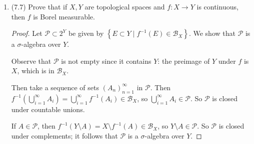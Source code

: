\documentclass[11pt]{article}
\newcommand{\cbr}[1]{\left\{#1\right\}}
\begin{document}
\begin{enumerate}
\begin{enumerate}
\begin{proof}
          But we know that the real numbers are uncountable, and we seek to find a contradiction. To that end, suppose by contradiction that $\mathscr{B}_\mathbb{R}$ is atomic so that there exists a sequence $(A_n)_{n=1}^\infty$ of disjoint, nonempty subsets whose union is $\mathbb{R}$.

          We should be able to form for any real number $r$ the singleton set $\cbr{r}$ by taking a countable union of the $A_i$. Since the $A_i$ are disjoint and nonempty, it would follow that there is an $A_k$ appearing in this union that is actually just equal to $\cbr{r}$, and that the countable union is really just the union of the one set $A_k$. 
          
          Since this is true for any real number $r$, it would seem that either all of the $A_i$ are singleton sets of real numbers, or that there exists an $A_j$ with more than one element. We rule out the latter scenario: If $A_j$ contains more than one element, e.g., it contains real numbers $x,y$, then it is impossible to form the Borel set $\cbr{x}$ as a countable union of the $A_i$ since each of the $A_i$ are disjoint.
          
          It must follow then that each of the $A_i$s are singleton sets of real numbers. However, the real numbers are uncountable so that it is impossible for $\bigcap_{n=1}^\infty A_n$ to be equal to $\mathbb{R}$. This is a contradiction, so $\mathscr{B}_\mathbb{R}$ is not atomic.
        \end{proof}
    \end{enumerate}
    \item (7.7) Prove that if $X,Y$ are topological spaces and $f\colon X\to Y$ is continuous, then $f$ is Borel measurable. \begin{proof}
      Let $\mathscr{P}\subset 2^Y$ be given by $\cbr{E\subset Y\mid f^{-1}(E)\in \mathscr{B}_X}$. We show that $\mathscr{P}$ is a $\sigma$-algebra over $Y$. 

      Observe that $\mathscr{P}$ is not empty since it contains $Y$: the preimage of $Y$ under $f$ is $X$, which is in $\mathscr{B}_X$.

      Then take a sequence of sets $(A_n)_{n=1}^\infty$ in $\mathscr{P}$. Then $f^{-1}\left(\bigcup_{i=1}^\infty A_i\right) = \bigcup_{i=1}^\infty f^{-1}(A_i)\in \mathscr{B}_X$, so $\bigcup_{i=1}^\infty A_i\in \mathscr{P}$. So $\mathscr{P}$ is closed under countable unions.

      If $A\in \mathscr{P}$, then $f^{-1}(Y\setminus A) = X\setminus f^{-1}(A)\in\mathscr{B}_X$, so $Y\setminus A\in\mathscr{P}$. So $\mathscr{P}$ is closed under complements; it follows that $\mathscr{P}$ is a $\sigma$-algebra over $Y$.


\end{proof}
\end{enumerate}
\end{document}
